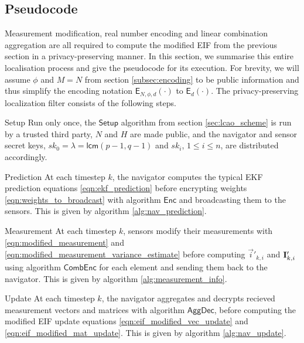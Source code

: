 \documentclass[10pt,letterpaper,oneside,twocolumn,journal]{IEEEtran}
\theoremstyle{definition}
\theoremstyle{definition}
\theoremstyle{remark}
\begin{document}
\subsection{Pseudocode} \label{subsec:pseudocode}
Measurement modification, real number encoding and linear combination aggregation are all required to compute the modified EIF from the previous section in a privacy-preserving manner. In this section, we summarise this entire localisation process and give the pseudocode for its execution. For brevity, we will assume $\phi$ and $M=N$ from section \ref{subsec:encoding} to be public information and thus simplify the encoding notation $\mathsf{E}_{N,\phi,d}(\cdot)$ to $\mathsf{E}_{d}(\cdot)$. The privacy-preserving localization filter consists of the following steps.
\begin{LaTeXdescription}
    \item[Setup] Run only once, the $\mathsf{Setup}$ algorithm from section \ref{sec:lcao_scheme} is run by a trusted third party, $N$ and $H$ are made public, and the navigator and sensor secret keys, $sk_0=\lambda=\mathsf{lcm}(p-1, q-1)$ and $sk_i$, $1 \leq i \leq n$, are distributed accordingly. 

    \item[Prediction] At each timestep $k$, the navigator computes the typical EKF prediction equations \eqref{eqn:ekf_prediction} before encrypting weights \eqref{eqn:weights_to_broadcast} with algorithm $\mathsf{Enc}$ and broadcasting them to the sensors. This is given by algorithm \ref{alg:nav_prediction}.

    \item[Measurement] At each timestep $k$, sensors modify their measurements with \eqref{eqn:modified_measurement} and \eqref{eqn:modified_measurement_variance_estimate} before computing $\vec{i}'_{k,i}$ and ${{\mathbf{I}}}'_{k,i}$ using algorithm $\mathsf{CombEnc}$ for each element and sending them back to the navigator. This is given by algorithm \ref{alg:measurement_info}.

    \item[Update] At each timestep $k$, the navigator aggregates and decrypts recieved measurement vectors and matrices with algorithm $\mathsf{AggDec}$, before computing the modified EIF update equations \eqref{eqn:eif_modified_vec_update} and \eqref{eqn:eif_modified_mat_update}. This is given by algorithm \ref{alg:nav_update}.
\end{LaTeXdescription}
\end{document}
